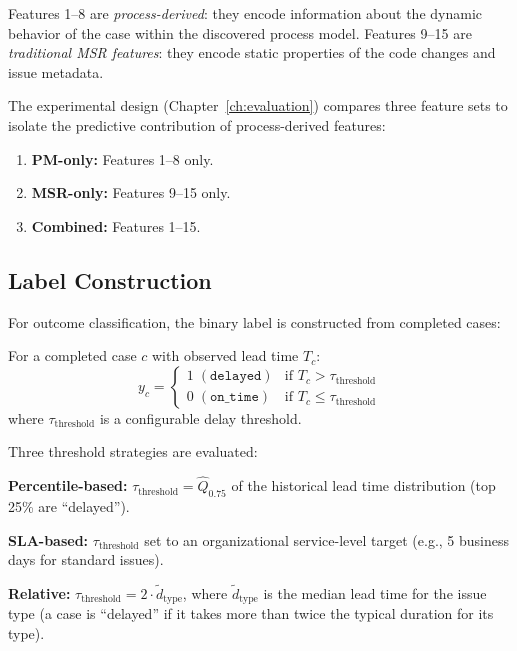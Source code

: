 Features 1--8 are \emph{process-derived}: they encode information about 
the dynamic behavior of the case within the discovered process model. 
Features 9--15 are \emph{traditional MSR features}: they encode static 
properties of the code changes and issue metadata.

The experimental design (Chapter~\ref{ch:evaluation}) compares three 
feature sets to isolate the predictive contribution of process-derived 
features:

\begin{enumerate}
    \item \textbf{PM-only:} Features 1--8 only.
    \item \textbf{MSR-only:} Features 9--15 only.
    \item \textbf{Combined:} Features 1--15.
\end{enumerate}


\subsection{Label Construction}
\label{sec:ml-labels}

For outcome classification, the binary label is constructed from 
completed cases:

\begin{definition}
\label{def:label}
For a completed case $c$ with observed lead time $T_c$:
\begin{equation}
\label{eq:label}
y_c = \begin{cases}
    1 \; (\texttt{delayed}) & \text{if } T_c > \tau_{\text{threshold}} \\
    0 \; (\texttt{on\_time}) & \text{if } T_c \leq \tau_{\text{threshold}}
\end{cases}
\end{equation}
where $\tau_{\text{threshold}}$ is a configurable delay threshold.
\end{definition}

Three threshold strategies are evaluated:

\textbf{Percentile-based:} $\tau_{\text{threshold}} = \hat{Q}_{0.75}$ of 
the historical lead time distribution (top 25\% are ``delayed'').

\textbf{SLA-based:} $\tau_{\text{threshold}}$ set to an organizational 
service-level target (e.g., 5 business days for standard issues).

\textbf{Relative:} $\tau_{\text{threshold}} = 2 \cdot \tilde{d}_{\text{type}}$, 
where $\tilde{d}_{\text{type}}$ is the median lead time for the issue type 
(a case is ``delayed'' if it takes more than twice the typical duration for 
its type).


